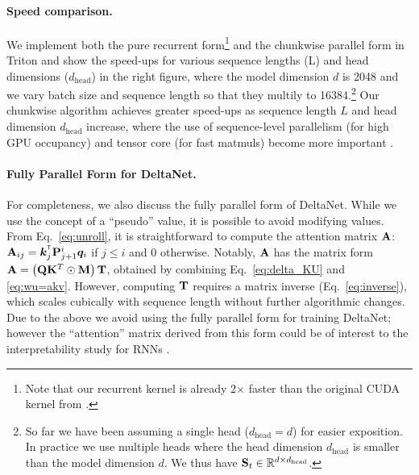 \paragraph{Speed comparison.} 
We implement both the pure recurrent form\footnote{Note that our recurrent  kernel is already 2$\times$ faster than the original CUDA kernel from \citet{schlag_linear_2021}.} and the chunkwise parallel form in Triton \cite{triton} and show the speed-ups for various sequence lengths (L) and head dimensions ($d_\text{head}$) in the right figure, where the model dimension $d$ is 2048 and we vary batch size and sequence length so that they multily to 16384.\footnote{So far we have been assuming a single head ($d_\text{head} = d$) for easier exposition. In practice we use multiple heads where the head dimension $d_\text{head}$ is smaller than the model dimension $d$. We thus have ${\mathbf{S}}_{t} \in \mathbb{R}^{d \times d_\text{head}}$.}
Our chunkwise algorithm achieves greater speed-ups as sequence length \( L \) and head dimension \( d_\text{head} \) increase, where the use of sequence-level parallelism (for high GPU occupancy) and tensor core (for fast matmuls) become more important \cite[][\S 3]{yang_gated_2023}. 

\paragraph{Fully Parallel Form for DeltaNet.}
For completeness, we also discuss the fully parallel form of DeltaNet. While we use the concept of a ``pseudo'' value, it is possible to avoid modifying values. From Eq.~\ref{eq:unroll}, it is straightforward to compute the attention matrix ${\mathbf{A}}$: $\rmA_{ij} = \vk_j^\intercal \rmP_{j+1}^i \vq_i $ if $j \le i$ and $0$ otherwise. Notably, ${\mathbf{A}}$ has the matrix form $
{\mathbf{A}} = \left({\mathbf{Q}}{\mathbf{K}}^T \odot {\mathbf{M}}\right) {\mathbf{T}} $, obtained by combining Eq.~\ref{eq:delta_KU} and \ref{eq:wu=akv}.
However, computing ${\mathbf{T}}$ requires a matrix inverse (Eq.~\ref{eq:inverse}), which scales cubically with sequence length without further algorithmic changes. 
Due to the above we avoid using the fully parallel form for training DeltaNet; however the ``attention'' matrix derived from this form could be of interest to the interpretability study for RNNs \cite{ali2024hidden, DBLP:journals/corr/abs-2405-16504}.

\vspace{-2mm}
